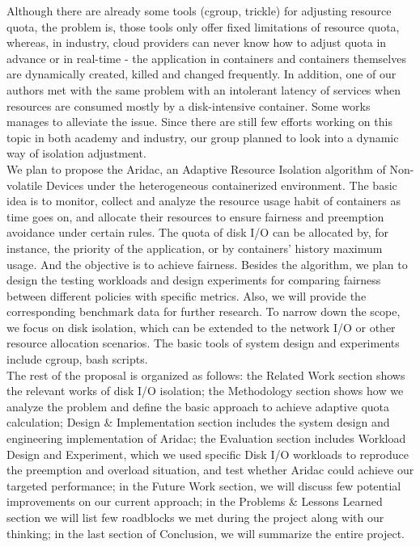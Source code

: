 \documentclass[10pt, conference,compsoc]{IEEEtran}
\begin{document}
Although there are already some tools (cgroup, trickle) for adjusting resource quota, the problem is, those tools only offer fixed limitations of resource quota, whereas, in industry, cloud providers can never know how to adjust quota in advance or in real-time - the application in containers and containers themselves are dynamically created, killed and changed frequently. In addition, one of our authors met with the same problem with an intolerant latency of services when resources are consumed mostly by a disk-intensive container. Some works \cite{Sungyong16} manages to alleviate the issue. Since there are still few efforts working on this topic in both academy and industry, our group planned to look into a dynamic way of isolation adjustment.\\

We plan to propose the Aridac, an Adaptive Resource Isolation algorithm of Non-volatile Devices under the heterogeneous containerized environment. The basic idea is to monitor, collect and analyze the resource usage habit of containers as time goes on, and allocate their resources to ensure fairness and preemption avoidance under certain rules. The quota of disk I/O can be allocated by, for instance, the priority of the application, or by containers' history maximum usage. And the objective is to achieve fairness. Besides the algorithm, we plan to design the testing workloads and design experiments for comparing fairness between different policies with specific metrics. Also, we will provide the corresponding benchmark data for further research. To narrow down the scope, we focus on disk isolation, which can be extended to the network I/O or other resource allocation scenarios. The basic tools of system design and experiments include cgroup, bash scripts.\\

The rest of the proposal is organized as follows: the Related Work section shows the relevant works of disk I/O isolation; the Methodology section shows how we analyze the problem and define the basic approach to achieve adaptive quota calculation; Design & Implementation section includes the system design and engineering implementation of Aridac; the Evaluation section includes Workload Design and Experiment, which we used specific Disk I/O workloads to reproduce the preemption and overload situation, and test whether Aridac could achieve our targeted performance; in the Future Work section, we will discuss few potential improvements on our current approach; in the Problems & Lessons Learned section we will list few roadblocks we met during the project along with our thinking; in the last section of Conclusion, we will summarize the entire project. \\
\end{document}
